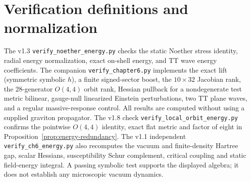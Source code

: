 \documentclass[11pt,a4paper]{article}
\theoremstyle{definition}\newtheorem{definition}[theorem]{Definition}
\theoremstyle{remark}\newtheorem{remark}[theorem]{Remark}
\begin{document}
\section{Verification definitions and normalization}
The v1.3 \texttt{verify\_noether\_energy.py} checks the static Noether stress identity, radial energy normalization, exact on-shell energy, and TT wave energy coefficients. The companion \texttt{verify\_chapter6.py} implements the exact lift (symmetric symbolic $h$), a finite signed-sector boost, the $10\times32$ Jacobian rank, the $28$-generator $O(4,4)$ orbit rank, Hessian pullback for a nondegenerate test metric bilinear, gauge-null linearized Einstein perturbations, two TT plane waves, and a regular massive-response control. All results are computed without using a supplied graviton propagator. The v1.8 check \texttt{verify\_local\_orbit\_energy.py} confirms the pointwise $O(4,4)$ identity, exact flat metric and factor of eight in Proposition~\ref{prop:energy-redundancy}. The v1.1 independent \texttt{verify\_ch6\_energy.py} also recomputes the vacuum and finite-density Hartree gap, scalar Hessians, susceptibility Schur complement, critical coupling and static field-energy integral. A passing symbolic test supports the displayed algebra; it does not establish any microscopic vacuum dynamics.


\clearpage
\end{document}
